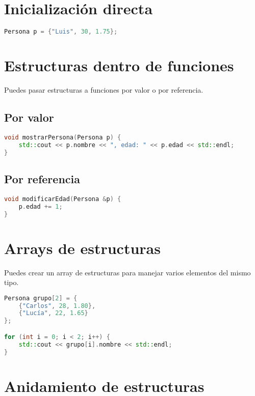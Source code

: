 \documentclass[a4paper]{article}
\begin{document}
\section{Inicialización directa}

\begin{lstlisting}[language=C++]
Persona p = {"Luis", 30, 1.75};
\end{lstlisting}

\section{Estructuras dentro de funciones}

Puedes pasar estructuras a funciones por valor o por referencia.

\subsection*{Por valor}

\begin{lstlisting}[language=C++]
void mostrarPersona(Persona p) {
    std::cout << p.nombre << ", edad: " << p.edad << std::endl;
}
\end{lstlisting}

\subsection*{Por referencia}

\begin{lstlisting}[language=C++]
void modificarEdad(Persona &p) {
    p.edad += 1;
}
\end{lstlisting}

\section{Arrays de estructuras}

Puedes crear un array de estructuras para manejar varios elementos del mismo tipo.

\begin{lstlisting}[language=C++]
Persona grupo[2] = {
    {"Carlos", 28, 1.80},
    {"Lucía", 22, 1.65}
};

for (int i = 0; i < 2; i++) {
    std::cout << grupo[i].nombre << std::endl;
}
\end{lstlisting}

\section{Anidamiento de estructuras}
\end{document}
